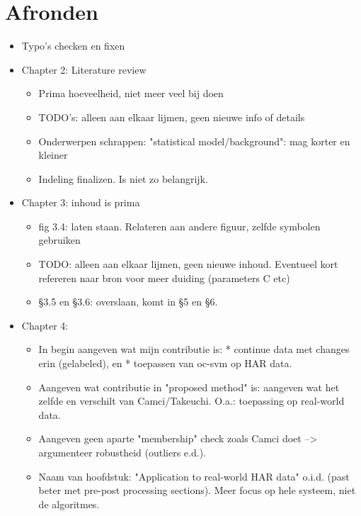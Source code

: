 
\chapter{Afronden} %

\label{AppendixF} %


\begin{itemize}
  \item Typo's checken en fixen
  \item Chapter 2: Literature review
  \begin{itemize}
    \item Prima hoeveelheid, niet meer veel bij doen
    \item TODO's: alleen aan elkaar lijmen, geen nieuwe info of details
    \item Onderwerpen schrappen: "statistical model/background": mag korter en kleiner
    \item Indeling finalizen. Is niet zo belangrijk.
  \end{itemize}
  \item Chapter 3: inhoud is prima
  \begin{itemize}
    \item fig 3.4: laten staan. Relateren aan andere figuur, zelfde symbolen gebruiken
    \item TODO: alleen aan elkaar lijmen, geen nieuwe inhoud. Eventueel kort refereren naar bron voor meer duiding (parameters C etc)
    \item §3.5 en §3.6: overslaan, komt in §5 en §6.
  \end{itemize}
  \item Chapter 4:
  \begin{itemize}
    \item In begin aangeven wat mijn contributie is: * continue data met changes erin (gelabeled), en * toepassen van oc-svm op HAR data.
    \item Aangeven wat contributie in "proposed method" is: aangeven wat het zelfde en verschilt van Camci/Takeuchi. O.a.: toepassing op real-world data.
    \item Aangeven geen aparte "membership" check zoals Camci doet --> argumenteer robustheid (outliers e.d.).
    \item Naam van hoofdstuk: "Application to real-world HAR data" o.i.d. (past beter met pre-post processing sections). Meer focus op hele systeem, niet de algoritmes.

\end{itemize}
\end{itemize}
